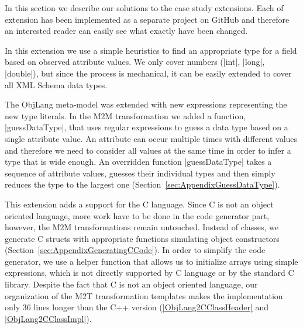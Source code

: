 
\label{sec:Extensions}


In this section we describe our solutions to the case study extensions.
Each of extension has been implemented as a separate project on GitHub and therefore an interested reader can easily see what exactly have been changed.

\label{sec:Extension1}

In this extension we use a simple heuristics to find an appropriate type for a field based on observed attribute values.
We only cover numbers (\Scala|int|, \Scala|long|, \Scala|double|), but since the process is mechanical, it can be easily extended to cover all XML Schema data types.

The ObjLang meta-model was extended with new expressions representing the new type literals.
In the M2M transformation we added a function, \Scala|guessDataType|, that uses regular expressions to guess a data type based on a single attribute value.
An attribute can occur multiple times with different values and therefore we need to consider all values at the same time in order to infer a type that is wide enough.
An overridden function \Scala|guessDataType| takes a sequence of attribute values, guesses their individual types and then simply reduces the type to the largest one (\Cf Section~\ref{sec:AppendixGuessDataType}).

\label{sec:Extension2}

This extension adds a support for the C language.
Since C is not an object oriented language, more work have to be done in the code generator part, however, the M2M transformations remain untouched.
%
Instead of classes, we generate C structs with appropriate functions simulating object constructors (\Cf Section~\ref{sec:AppendixGeneratingCCode}).
In order to simplify the code generator, we use a helper function that allows us to initialize arrays using simple expressions, which is not directly supported by C language or by the standard C library.
%
Despite the fact that C is not an object oriented language, our organization of the M2T transformation templates makes the implementation only 36 lines longer than the C++ version (\Cf \href{https://github.com/fikovnik/ttc14-fixml-sigma/blob/master/ttc14-fixml-extension-2/src/fr/inria/spirals/sigma/ttc14/fixml/ObjLang2CClassHeader.scala}{\Scala|ObjLang2CClassHeader|} and \href{https://github.com/fikovnik/ttc14-fixml-sigma/blob/master/ttc14-fixml-extension-2/src/fr/inria/spirals/sigma/ttc14/fixml/ObjLang2CClassHeader.scala}{\Scala|ObjLang2CClassImpl|}).

